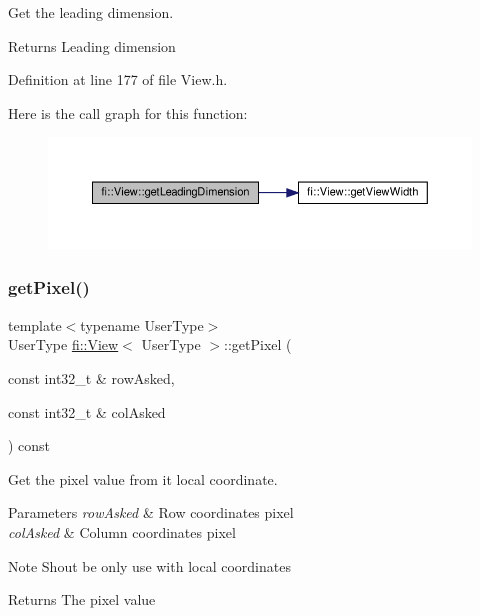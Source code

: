 Get the leading dimension. 

\begin{DoxyReturn}{Returns}
Leading dimension 
\end{DoxyReturn}


Definition at line 177 of file View.\+h.

Here is the call graph for this function\+:
\nopagebreak
\begin{figure}[H]
\begin{center}
\leavevmode
\includegraphics[width=350pt]{d5/dd4/classfi_1_1View_aafc262cff3e6af06f7c626bc4a0da4cf_cgraph}
\end{center}
\end{figure}
\mbox{\label{classfi_1_1View_a5b05f97a8d0a58a8126911a0467f4544}} 
\subsubsection{\texorpdfstring{get\+Pixel()}{getPixel()}}
{\footnotesize\ttfamily template$<$typename User\+Type$>$ \\
User\+Type \hyperlink{classfi_1_1View}{fi\+::\+View}$<$ User\+Type $>$\+::get\+Pixel (\begin{DoxyParamCaption}\item[{const int32\+\_\+t \&}]{row\+Asked,  }\item[{const int32\+\_\+t \&}]{col\+Asked }\end{DoxyParamCaption}) const\hspace{0.3cm}{\ttfamily [inline]}}



Get the pixel value from it local coordinate. 


\begin{DoxyParams}{Parameters}
{\em row\+Asked} & Row coordinate\textquotesingle{}s pixel \\
\hline
{\em col\+Asked} & Column coordinate\textquotesingle{}s pixel \\
\hline
\end{DoxyParams}
\begin{DoxyNote}{Note}
Shout be only use with local coordinates 
\end{DoxyNote}
\begin{DoxyReturn}{Returns}
The pixel value 
\end{DoxyReturn}


